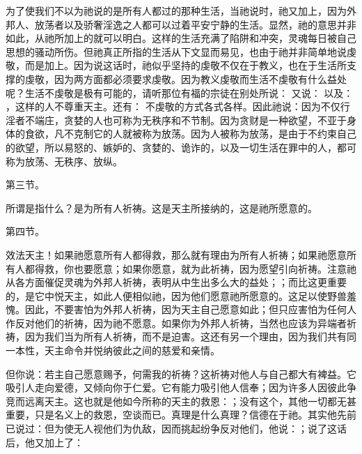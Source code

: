 为了使我们不以为祂说的是所有人都过的那种生活，当祂说时，祂又加上，因为外邦人、放荡者以及骄奢淫逸之人都可以过着平安宁静的生活。显然，祂的意思并非如此，从祂所加上的就可以明白。这样的生活充满了陷阱和冲突，灵魂每日被自己思想的骚动所伤。但祂真正所指的生活从下文显而易见，也由于祂并非简单地说虔敬，而是加上。因为说这话时，祂似乎坚持的虔敬不仅在于教义，也在于生活所支撑的虔敬，因为两方面都必须要求虔敬。因为教义虔敬而生活不虔敬有什么益处呢？生活不虔敬是极有可能的，请听那位有福的宗徒在别处所说：  又说：  以及：  ，这样的人不尊重天主。还有：  不虔敬的方式各式各样。因此祂说：因为不仅行淫者不端庄，贪婪的人也可称为无秩序和不节制。因为贪财是一种欲望，不亚于身体的食欲，凡不克制它的人就被称为放荡。因为人被称为放荡，是由于不约束自己的欲望，所以易怒的、嫉妒的、贪婪的、诡诈的，以及一切生活在罪中的人，都可称为放荡、无秩序、放纵。\par

第三节。 \par

所谓是指什么？是为所有人祈祷。这是天主所接纳的，这是祂所愿意的。\par

第四节。 \par

效法天主！如果祂愿意所有人都得救，那么就有理由为所有人祈祷；如果祂愿意所有人都得救，你也要愿意；如果你愿意，就为此祈祷，因为愿望引向祈祷。注意祂从各方面催促灵魂为外邦人祈祷，表明从中生出多么大的益处；；而比这更重要的，是它中悦天主，如此人便相似祂，因为他们愿意祂所愿意的。这足以使野兽羞愧。因此，不要害怕为外邦人祈祷，因为天主自己愿意如此；但只应害怕为任何人作反对他们的祈祷，因为祂不愿意。如果你为外邦人祈祷，当然也应该为异端者祈祷，因为我们当为所有人祈祷，而不是迫害。这还有另一个理由，因为我们共有同一本性，天主命令并悦纳彼此之间的慈爱和亲情。\par

但你说：若主自己愿意赐予，何需我的祈祷？这祈祷对他人与自己都大有裨益。它吸引人走向爱德，又倾向你于仁爱。它有能力吸引他人信奉；因为许多人因彼此争竞而远离天主。这也就是他如今所称的天主的救恩：；没有这个，其他一切都无甚重要，只是名义上的救恩，空谈而已。真理是什么真理？信德在于祂。其实他先前已说过：但为使无人视他们为仇敌，因而挑起纷争反对他们，他说：；说了这话后，他又加上了：\par

